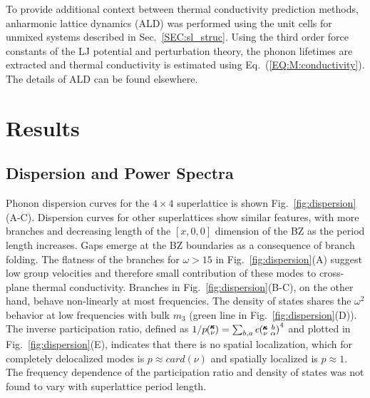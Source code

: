 \documentclass[aps,prb,preprint,preprintnumbers,amsmath,amssymb,floatfix,superscriptaddress]{revtex4}
\newcommand{\kvba}{\mspace{-4.0mu}\left(\mspace{-8.0mu}
\begin{smallmatrix} &\pmb{\kappa} &b \\ &\nu &\alpha\end{smallmatrix}
\mspace{-3.0mu}\right)}
\newcommand{\kv}{\mspace{-4.0mu}\left(\mspace{-8.0mu}
\begin{smallmatrix}&\pmb{\kappa} \\&\nu\end{smallmatrix}
\mspace{-3.0mu}\right)}
\begin{document}
To provide additional context between thermal conductivity prediction methods, anharmonic lattice dynamics (ALD) was performed using the unit cells for unmixed systems described in Sec.~\ref{SEC:sl_struc}. Using the third order force constants of the LJ potential and perturbation theory, the phonon lifetimes are extracted and thermal conductivity is estimated using Eq.~(\ref{EQ:M:conductivity}). The details of ALD can be found elsewhere.\cite{PhysRevB.79.064301}

\section{Results}
\subsection{Dispersion and Power Spectra}

Phonon dispersion curves for the $4\times4$ superlattice is shown Fig.~\ref{fig:dispersion}(A-C). Dispersion curves for other superlattices show similar features, with more branches and decreasing length of the $[x,0,0]$ dimension of the BZ as the period length increases. Gaps emerge at the BZ boundaries as a consequence of branch folding.\cite{PhysRevB.38.1427,PhysRevB.60.2627} The flatness of the branches for $\omega > 15$ in Fig.~\ref{fig:dispersion}(A) suggest low group velocities and therefore small contribution of these modes to cross-plane thermal conductivity. Branches in Fig.~\ref{fig:dispersion}(B-C), on the other hand, behave non-linearly at most frequencies. The density of states shares the $\omega^2$ behavior at low frequencies with bulk $m_3$ (green line in Fig.~\ref{fig:dispersion}(D)). The inverse participation ratio, defined as $1/p\kv=\sum_{b,a}e\kvba^4$ and plotted in Fig.~\ref{fig:dispersion}(E), indicates that there is no spatial localization, which for completely delocalized modes is $p\approx card(\nu)$ and spatially localized is $p\approx 1$. \cite{PhysRevB.70.235214} The frequency dependence of the participation ratio and density of states was not found to vary with superlattice period length.
\renewcommand{\topfraction}{0.7}
\begin{figure*}%
\begin{center}
\renewcommand{\figure}{Fig.}
\caption{Dispersion (A,B,C), density of states (D) and inverse participation ratio (E) of a $4\times4$ superlattice. Red squares represent select modes for Fig.~\ref{fig:sed}.}
\label{fig:dispersion}
\end{center}
\end{figure*}
\end{document}
